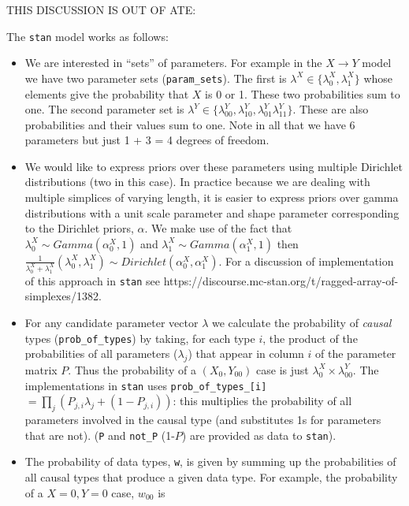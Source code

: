 \documentclass[
  article]{jss}
\begin{document}
THIS DISCUSSION IS OUT OF ATE:

The \texttt{stan} model works as follows:

\begin{itemize}
\item
  We are interested in ``sets'' of parameters. For example in the
  \(X \rightarrow Y\) model we have two parameter sets
  (\texttt{param\_sets}). The first is
  \(\lambda^X \in \{\lambda^X_0, \lambda^X_1\}\) whose elements give the
  probability that \(X\) is 0 or 1. These two probabilities sum to one.
  The second parameter set is
  \(\lambda^Y \in \{\lambda^Y_{00}, \lambda^Y_{10}, \lambda^Y_{01} \lambda^Y_{11}\}\).
  These are also probabilities and their values sum to one. Note in all
  that we have 6 parameters but just 1 + 3 = 4 degrees of freedom.
\item
  We would like to express priors over these parameters using multiple
  Dirichlet distributions (two in this case). In practice because we are
  dealing with multiple simplices of varying length, it is easier to
  express priors over gamma distributions with a unit scale parameter
  and shape parameter corresponding to the Dirichlet priors, \(\alpha\).
  We make use of the fact that \(\lambda^X_0 \sim Gamma(\alpha^X_0,1)\)
  and \(\lambda^X_1 \sim Gamma(\alpha^X_1,1)\) then
  \(\frac{1}{\lambda^X_0 +\lambda^X_1}(\lambda^X_0, \lambda^X_1) \sim Dirichlet(\alpha^X_0, \alpha^X_1)\).
  For a discussion of implementation of this approach in \texttt{stan}
  see https://discourse.mc-stan.org/t/ragged-array-of-simplexes/1382.
\item
  For any candidate parameter vector \(\lambda\) we calculate the
  probability of \emph{causal} types (\texttt{prob\_of\_types}) by
  taking, for each type \(i\), the product of the probabilities of all
  parameters (\(\lambda_j\)) that appear in column \(i\) of the
  parameter matrix \(P\). Thus the probability of a \((X_0,Y_{00})\)
  case is just \(\lambda^X_0 \times \lambda^Y_{00}\). The
  implementations in \texttt{stan} uses
  \texttt{prob\_of\_types\_{[}i{]}}
  \(= \prod_j \left(P_{j,i} \lambda_j + (1-P_{j,i})\right)\): this
  multiplies the probability of all parameters involved in the causal
  type (and substitutes 1s for parameters that are not). (\texttt{P} and
  \texttt{not\_P} (1-\(P\)) are provided as data to \texttt{stan}).
\item
  The probability of data types, \texttt{w}, is given by summing up the
  probabilities of all causal types that produce a given data type. For
  example, the probability of a \(X=0,Y=0\) case, \(w_{00}\) is

\end{itemize}
\end{document}
